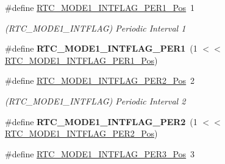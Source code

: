\begin{DoxyCompactItemize}
\item 
\hypertarget{group___s_a_m_l21___r_t_c_gaeb27717e87b2899bd27f9dec2825f567}{}\#define \hyperlink{group___s_a_m_l21___r_t_c_gaeb27717e87b2899bd27f9dec2825f567}{R\+T\+C\+\_\+\+M\+O\+D\+E1\+\_\+\+I\+N\+T\+F\+L\+A\+G\+\_\+\+P\+E\+R1\+\_\+\+Pos}~1\label{group___s_a_m_l21___r_t_c_gaeb27717e87b2899bd27f9dec2825f567}

\begin{DoxyCompactList}\small\item\em (R\+T\+C\+\_\+\+M\+O\+D\+E1\+\_\+\+I\+N\+T\+F\+L\+A\+G) Periodic Interval 1 \end{DoxyCompactList}\item 
\hypertarget{group___s_a_m_l21___r_t_c_ga121a6b810fbcb482b2adc596f1cce870}{}\#define {\bfseries R\+T\+C\+\_\+\+M\+O\+D\+E1\+\_\+\+I\+N\+T\+F\+L\+A\+G\+\_\+\+P\+E\+R1}~(1 $<$$<$ \hyperlink{group___s_a_m_l21___r_t_c_gaeb27717e87b2899bd27f9dec2825f567}{R\+T\+C\+\_\+\+M\+O\+D\+E1\+\_\+\+I\+N\+T\+F\+L\+A\+G\+\_\+\+P\+E\+R1\+\_\+\+Pos})\label{group___s_a_m_l21___r_t_c_ga121a6b810fbcb482b2adc596f1cce870}

\item 
\hypertarget{group___s_a_m_l21___r_t_c_gabddc4b8013efd75d5d67773bb61515c4}{}\#define \hyperlink{group___s_a_m_l21___r_t_c_gabddc4b8013efd75d5d67773bb61515c4}{R\+T\+C\+\_\+\+M\+O\+D\+E1\+\_\+\+I\+N\+T\+F\+L\+A\+G\+\_\+\+P\+E\+R2\+\_\+\+Pos}~2\label{group___s_a_m_l21___r_t_c_gabddc4b8013efd75d5d67773bb61515c4}

\begin{DoxyCompactList}\small\item\em (R\+T\+C\+\_\+\+M\+O\+D\+E1\+\_\+\+I\+N\+T\+F\+L\+A\+G) Periodic Interval 2 \end{DoxyCompactList}\item 
\hypertarget{group___s_a_m_l21___r_t_c_ga14fdb9a687015c9828c6ecc2987d71b8}{}\#define {\bfseries R\+T\+C\+\_\+\+M\+O\+D\+E1\+\_\+\+I\+N\+T\+F\+L\+A\+G\+\_\+\+P\+E\+R2}~(1 $<$$<$ \hyperlink{group___s_a_m_l21___r_t_c_gabddc4b8013efd75d5d67773bb61515c4}{R\+T\+C\+\_\+\+M\+O\+D\+E1\+\_\+\+I\+N\+T\+F\+L\+A\+G\+\_\+\+P\+E\+R2\+\_\+\+Pos})\label{group___s_a_m_l21___r_t_c_ga14fdb9a687015c9828c6ecc2987d71b8}

\item 
\hypertarget{group___s_a_m_l21___r_t_c_ga89128f57810868cd724b8d2ed74d6b7f}{}\#define \hyperlink{group___s_a_m_l21___r_t_c_ga89128f57810868cd724b8d2ed74d6b7f}{R\+T\+C\+\_\+\+M\+O\+D\+E1\+\_\+\+I\+N\+T\+F\+L\+A\+G\+\_\+\+P\+E\+R3\+\_\+\+Pos}~3\label{group___s_a_m_l21___r_t_c_ga89128f57810868cd724b8d2ed74d6b7f}


\end{DoxyCompactItemize}
